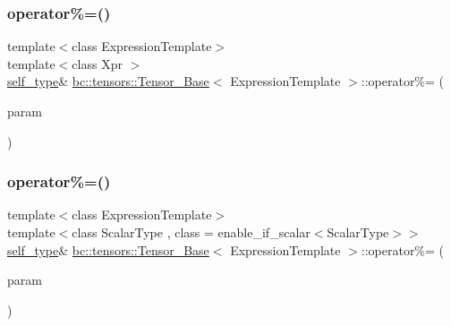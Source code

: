 \mbox{\label{classbc_1_1tensors_1_1Tensor__Base_a3c14abdab393eadebaa55640dc26a4ee}} 
\subsubsection{\texorpdfstring{operator\%=()}{operator\%=()}\hspace{0.1cm}{\footnotesize\ttfamily [1/2]}}
{\footnotesize\ttfamily template$<$class Expression\+Template$>$ \\
template$<$class Xpr $>$ \\
\hyperlink{classbc_1_1tensors_1_1Expression__Base}{self\+\_\+type}\& \hyperlink{classbc_1_1tensors_1_1Tensor__Base}{bc\+::tensors\+::\+Tensor\+\_\+\+Base}$<$ Expression\+Template $>$\+::operator\%= (\begin{DoxyParamCaption}\item[{const \hyperlink{classbc_1_1tensors_1_1Expression__Base}{Expression\+\_\+\+Base}$<$ Xpr $>$ \&}]{param }\end{DoxyParamCaption})\hspace{0.3cm}{\ttfamily [inline]}}

\mbox{\label{classbc_1_1tensors_1_1Tensor__Base_a6864701fc5fb5078de073762d6af4344}} 
\subsubsection{\texorpdfstring{operator\%=()}{operator\%=()}\hspace{0.1cm}{\footnotesize\ttfamily [2/2]}}
{\footnotesize\ttfamily template$<$class Expression\+Template$>$ \\
template$<$class Scalar\+Type , class  = enable\+\_\+if\+\_\+scalar$<$\+Scalar\+Type$>$$>$ \\
\hyperlink{classbc_1_1tensors_1_1Expression__Base}{self\+\_\+type}\& \hyperlink{classbc_1_1tensors_1_1Tensor__Base}{bc\+::tensors\+::\+Tensor\+\_\+\+Base}$<$ Expression\+Template $>$\+::operator\%= (\begin{DoxyParamCaption}\item[{const Scalar\+Type \&}]{param }\end{DoxyParamCaption})\hspace{0.3cm}{\ttfamily [inline]}}

